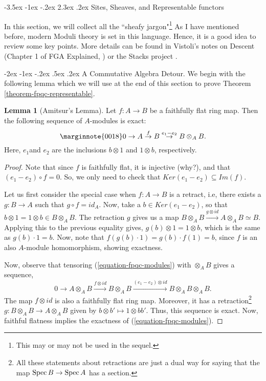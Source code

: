 \documentclass[11pt]{amsart}
\makeatletter
\renewcommand\section{\@startsection {section}{1}{\z@}%
	{-3.5ex \@plus -1ex \@minus -.2ex}%
	{2.3ex \@plus.2ex}%
	{\normalfont\scshape\center}}
\renewcommand\subsection{\@startsection {subsection}{1}{\z@}%
	{-2ex \@plus -1ex \@minus -.2ex}%
	{.5ex \@plus.2ex}%
	{\normalfont\bfseries}}
\newcommand{\Spec}{{\rm Spec \,}}
\theoremstyle{definition}
\newtheorem{lemma}[theorem]{Lemma}
\makeatother
\begin{document}
\section{Sites, Sheaves, and Representable functors}\label{section-sites}

In this section, we will collect all the ``sheafy jargon"\footnote{This may or may not be used in the sequel.} As I have mentioned before, modern Moduli theory is set in this language. Hence, it is a good idea to review some key points. More details can be found in Vistoli's notes on Descent (Chapter 1 of FGA Explained, \cite{FGAExplained}) or the Stacks project \cite{stacks-project}.

\subsection{A Commutative Algebra Detour.}
We begin with the following lemma which we will use at the end of this section to prove Theorem \ref{theorem-fpqc-representable}.

\begin{lemma}[Amitsur's Lemma]\label{lemma-Amitsur}
Let $f: A\rightarrow B$ be a faithfully flat ring map. Then the following sequence of $A$-modules is exact:
\begin{equation}\label{equation-fpqc-modules}\marginnote{0018}
0\rightarrow A\overset{f}{\rightarrow} B \overset{e_1-e_2}{\rightarrow} B\otimes_A B.
\end{equation}
Here, $e_1$and $e_2$ are the inclusions $b\otimes 1$ and $1\otimes b$, respectively.
\end{lemma}
\begin{proof}
Note that since $f$ is faithfully flat, it is injective (why?), and that $(e_1-e_2)\circ f=0$. So, we only need to check that $Ker(e_1-e_2)\subseteq Im(f)$.

Let us first consider the special case when $f:A\rightarrow B$ is a retract, i.e, there exists a $g:B\rightarrow A$ such that $g\circ f = id_A$. Now, take a $b\in Ker(e_1-e_2)$, so that  $b\otimes 1 = 1\otimes b \in B\otimes_A B$. The retraction $g$ gives us a map $B\otimes_A B\overset{g\otimes id}{\rightarrow} A\otimes_A B\simeq B$. Applying this to the previous equality gives, $g(b)\otimes 1=1\otimes b$, which is the same as $g(b)\cdot 1=b$. Now, note that $f(g(b)\cdot 1)=g(b)\cdot f(1)=b$, since $f$ is an also $A$-module homomorphism, showing exactness.

Now, observe that tensoring (\ref{equation-fpqc-modules}) with $\otimes_A B$ gives a sequence,
\[0\longrightarrow A\otimes_A B\overset{f\otimes id}{\longrightarrow} B\otimes_A B \overset{(e_1-e_2)\otimes id}{\longrightarrow} B\otimes_A B\otimes_A B.\]
The map $f\otimes id$ is also a faithfully flat ring map. Moreover, it has a retraction\footnote{All these statements about retractions are just a dual way for saying that the map $\Spec B\rightarrow \Spec A$ has a section.} $g: B\otimes_A B\rightarrow A\otimes_A B$ given by $b\otimes b'\mapsto 1\otimes bb'$. Thus, this sequence is exact. Now, faithful flatness implies the exactness of (\ref{equation-fpqc-modules}).
\end{proof}
\end{document}
